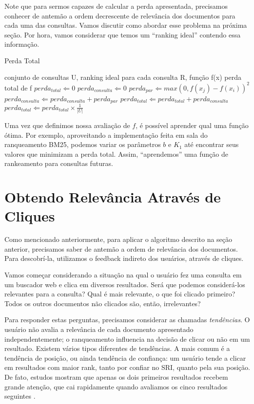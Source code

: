 \documentclass{svproc}
\begin{document}
Note que para sermos capazes de calcular a perda apresentada, precisamos conhecer de antemão a ordem decrescente de 
relevância  dos documentos para cada uma das consultas. Vamos discutir como abordar esse problema na próxima seção. 
Por hora, vamos considerar que temos um ``ranking ideal'' contendo essa informação.

\begin{algorithm}
  \caption{Perda Total}
  \begin{algorithmic}[1]
    \REQUIRE conjunto de consultas U, ranking ideal para cada consulta R, função f(x)
    \ENSURE perda total de f
    \STATE $perda_{total} \Leftarrow 0$
      \STATE $perda_{consulta} \Leftarrow 0$
	\STATE $perda_{par} \Leftarrow max(0, f(x_j) - f(x_i))^2$
	\STATE $perda_{consulta} \Leftarrow perda_{consulta} + perda_{par}$
      \ENDFOR
      \STATE $perda_{total} \Leftarrow perda_{total} + perda_{consulta}$
    \ENDFOR
    \STATE $perda_{total} \Leftarrow perda_{total} \times \frac{1}{|U|}$
  \end{algorithmic}
\end{algorithm}

\newpage

Uma vez que definimos nossa avaliação de $f$, é possível aprender qual uma função ótima. Por exemplo, aproveitando a 
implementação feita em sala do ranqueamento BM25, podemos variar os parâmetros $b$ e $K_1$ até encontrar seus 
valores que minimizam a perda total. Assim, ``aprendemos'' uma função de rankeamento para consultas futuras.


\section{Obtendo Relevância Através de Cliques}
Como mencionado anteriormente, para aplicar o algoritmo descrito na seção anterior, precisamos saber de antemão a ordem
de relevância dos documentos. Para descobrí-la, utilizamos o feedback indireto dos usuários, através de cliques.

Vamos começar considerando a situação na qual o usuário fez uma consulta em um buscador web e clica em diversos resultados.
Será que podemos considerá-los relevantes para a consulta? Qual é mais relevante, o que foi clicado primeiro?
Todos os outros documentos não clicados são, então, irrelevantes?

Para responder estas perguntas, precisamos considerar as chamadas \textit{tendências}. O usuário não avalia a relevância
de cada documento apresentado independentemente; o ranqueamento influencia na decisão de clicar ou não em um resultado.
Existem vários tipos diferentes de tendências. A mais comum é a tendência de posição, ou ainda tendência de confiança:
um usuário tende a clicar em resultados com maior rank, tanto por confiar no SRI, quanto pela sua posição.
De fato, estudos mostram que apenas os dois primeiros resultados recebem grande atenção, que cai rapidamente quando 
avaliamos os cinco resultados seguintes \cite{thorsten:granka:pan:hembrooke:gay}.
\end{document}

